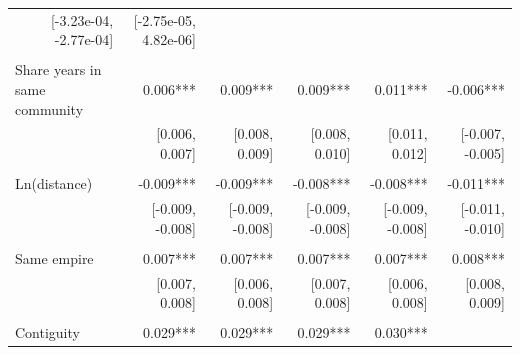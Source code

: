 \begin{table}[!h]
\begin{tabular}{llllll}
  \multicolumn{1}{r}{[-3.23e-04, -2.77e-04]} &
  \multicolumn{1}{r}{[-2.75e-05,  4.82e-06]} \\
\multicolumn{1}{l}{} &
  \multicolumn{1}{|r}{} &
  \multicolumn{1}{r}{} &
  \multicolumn{1}{r}{} &
  \multicolumn{1}{r}{} &
  \multicolumn{1}{r}{} \\
\multicolumn{1}{l}{Share years in same community} &
  \multicolumn{1}{|r}{0.006***} &
  \multicolumn{1}{r}{0.009***} &
  \multicolumn{1}{r}{0.009***} &
  \multicolumn{1}{r}{0.011***} &
  \multicolumn{1}{r}{-0.006***} \\
\multicolumn{1}{l}{} &
  \multicolumn{1}{|r}{[0.006,   0.007]} &
  \multicolumn{1}{r}{[0.008,   0.009]} &
  \multicolumn{1}{r}{[0.008,   0.010]} &
  \multicolumn{1}{r}{[0.011,   0.012]} &
  \multicolumn{1}{r}{[-0.007,  -0.005]} \\
\multicolumn{1}{l}{} &
  \multicolumn{1}{|r}{} &
  \multicolumn{1}{r}{} &
  \multicolumn{1}{r}{} &
  \multicolumn{1}{r}{} &
  \multicolumn{1}{r}{} \\
\multicolumn{1}{l}{Ln(distance)} &
  \multicolumn{1}{|r}{-0.009***} &
  \multicolumn{1}{r}{-0.009***} &
  \multicolumn{1}{r}{-0.008***} &
  \multicolumn{1}{r}{-0.008***} &
  \multicolumn{1}{r}{-0.011***} \\
\multicolumn{1}{l}{} &
  \multicolumn{1}{|r}{[-0.009,  -0.008]} &
  \multicolumn{1}{r}{[-0.009,  -0.008]} &
  \multicolumn{1}{r}{[-0.009,  -0.008]} &
  \multicolumn{1}{r}{[-0.009,  -0.008]} &
  \multicolumn{1}{r}{[-0.011,  -0.010]} \\
\multicolumn{1}{l}{} &
  \multicolumn{1}{|r}{} &
  \multicolumn{1}{r}{} &
  \multicolumn{1}{r}{} &
  \multicolumn{1}{r}{} &
  \multicolumn{1}{r}{} \\
\multicolumn{1}{l}{Same empire} &
  \multicolumn{1}{|r}{0.007***} &
  \multicolumn{1}{r}{0.007***} &
  \multicolumn{1}{r}{0.007***} &
  \multicolumn{1}{r}{0.007***} &
  \multicolumn{1}{r}{0.008***} \\
\multicolumn{1}{l}{} &
  \multicolumn{1}{|r}{[0.007,   0.008]} &
  \multicolumn{1}{r}{[0.006,   0.008]} &
  \multicolumn{1}{r}{[0.007,   0.008]} &
  \multicolumn{1}{r}{[0.006,   0.008]} &
  \multicolumn{1}{r}{[0.008,   0.009]} \\
\multicolumn{1}{l}{} &
  \multicolumn{1}{|r}{} &
  \multicolumn{1}{r}{} &
  \multicolumn{1}{r}{} &
  \multicolumn{1}{r}{} &
  \multicolumn{1}{r}{} \\
\multicolumn{1}{l}{Contiguity} &
  \multicolumn{1}{|r}{0.029***} &
  \multicolumn{1}{r}{0.029***} &
  \multicolumn{1}{r}{0.029***} &
  \multicolumn{1}{r}{0.030***} &

\end{tabular}
\end{table}
